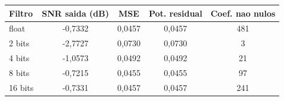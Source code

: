 \begin{tabular}{lcccc}
\toprule
Filtro & SNR saida (dB) & MSE & Pot. residual & Coef. nao nulos \\
\midrule
float & -0,7332 & 0,0457 & 0,0457 & 481 \\
2 bits & -2,7727 & 0,0730 & 0,0730 & 3 \\
4 bits & -1,0573 & 0,0492 & 0,0492 & 21 \\
8 bits & -0,7215 & 0,0455 & 0,0455 & 97 \\
16 bits & -0,7331 & 0,0457 & 0,0457 & 241 \\
\bottomrule
\end{tabular}